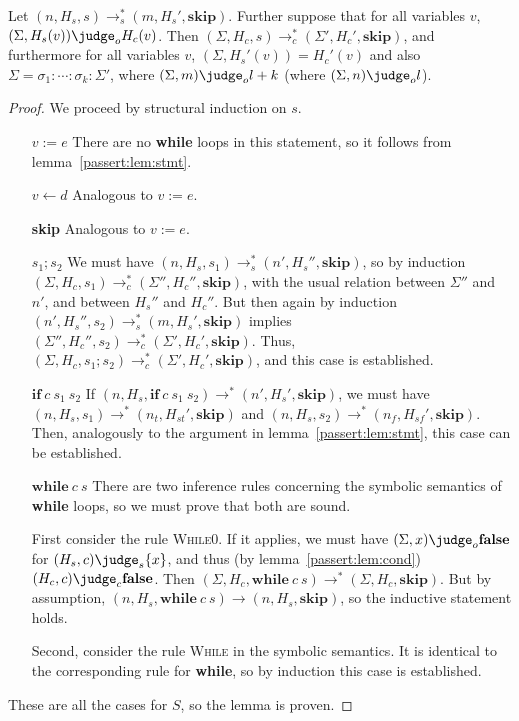 \begin{lemma} \label{passert:lem:whil}
    Let $(n, H_s, s) \to_s^{*} (m, H_s', \mathbf{skip})$.
  Further suppose that for all variables $v$,
  $(\Sigma, H_s(v)) \judge_o H_c(v)$.
  Then $(\Sigma, H_c, s) \to_c^{*} (\Sigma', H_c', \mathbf{skip})$,
  and furthermore for all variables $v$,
  $(\Sigma, H_s'(v)) = H_c'(v)$ and also
  $\Sigma = \sigma_1:\dotsb:\sigma_k:\Sigma'$,
  where $(\Sigma, m) \judge_o l + k$
  (where $(\Sigma, n) \judge_o l$).
\end{lemma}

\begin{proof}
  We proceed by structural induction on $s$.

  \begin{itemize}
  \item[$v := e$] There are no \textbf{while} loops in this statement,
    so it follows from lemma~\ref{passert:lem:stmt}.
  \item[$v \leftarrow d$] Analogous to $v := e$.
  \item[\textbf{skip}] Analogous to $v := e$.
  \item[$s_1 ; s_2$] 
    We must have
    $(n, H_s, s_1) \to_s^{*} (n', H_s'', \mathbf{skip})$,
    so by induction
    $(\Sigma, H_c, s_1) \to_c^{*} (\Sigma'', H_c'', \mathbf{skip})$,
    with the usual relation between $\Sigma''$ and $n'$, and between
    $H_s''$ and $H_c''$.
    But then again by induction
    $(n', H_s'', s_2) \to_s^{*} (m, H_s', \mathbf{skip})$
    implies
    $(\Sigma'', H_c'', s_2) \to_c^{*} (\Sigma', H_c', \mathbf{skip})$.
    Thus,
    $(\Sigma, H_c, s_1;s_2) \to_c^{*} (\Sigma', H_c', \mathbf{skip})$,
    and this case is established.
  \item[$\mathbf{if}\:c\:s_1\:s_2$]
      If $(n, H_s, \mathbf{if}\:c\:s_1\:s_2) \to^{*} (n', H_s', \mathbf{skip})$,
      we must have $(n, H_s, s_1) \to^{*} (n_t, H_{st}', \mathbf{skip})$
      and $(n, H_s, s_2) \to^{*} (n_f, H_{sf}', \mathbf{skip})$.  Then,
    analogously to the argument in lemma~\ref{passert:lem:stmt}, this case can
    be established.
  \item[$\mathbf{while}\:c\:s$]
    There are two inference rules concerning the symbolic semantics of
    \textbf{while} loops, so we must prove that both are sound.

    First consider the rule \textsc{While0}. If it applies, we must
    have $(\Sigma, x) \judge_o \mathbf{false}$
    for $(H_s, c) \judge_s \{ x \}$,
    and thus (by lemma~\ref{passert:lem:cond})
    $(H_c, c) \judge_c \mathbf{false}$.
    Then
    $(\Sigma, H_c, \mathbf{while}\:c\:s) \to^{*} (\Sigma, H_c, \mathbf{skip})$.
    But by assumption,
    $(n, H_s, \mathbf{while}\:c\:s) \to (n, H_s, \mathbf{skip})$,
    so the inductive statement holds.

    Second, consider the rule \textsc{While} in the symbolic
    semantics.  It is identical to the corresponding rule for
    \textbf{while}, so by induction this case is established.
  \end{itemize}

  These are all the cases for $S$, so the lemma is proven.
\end{proof}

